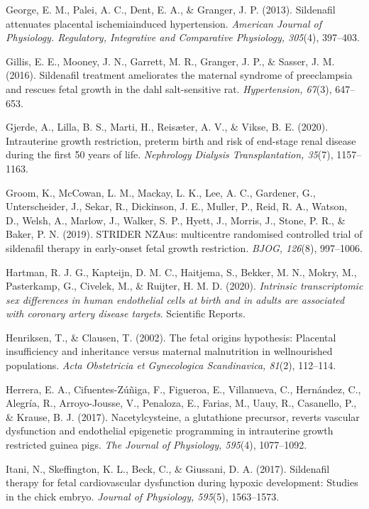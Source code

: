 \documentclass[authordate, empirical,issue]{jote-new-article}
\begin{document}
George, E. M., Palei, A. C., Dent, E. A., \& Granger, J. P. (2013). Sildenafil attenuates placental ischemiainduced hypertension. \emph{American Journal of Physiology. Regulatory, Integrative and Comparative Physiology, 305}(4), 397–403.

Gillis, E. E., Mooney, J. N., Garrett, M. R., Granger, J. P., \& Sasser, J. M. (2016). Sildenafil treatment ameliorates the maternal syndrome of preeclampsia and rescues fetal growth in the dahl salt-sensitive rat. \emph{Hypertension, 67}(3), 647–653.

Gjerde, A., Lilla, B. S., Marti, H., Reisæter, A. V., \& Vikse, B. E. (2020). Intrauterine growth restriction, preterm birth and risk of end-stage renal disease during the first 50 years of life. \emph{Nephrology Dialysis Transplantation, 35}(7), 1157–1163.

Groom, K., McCowan, L. M., Mackay, L. K., Lee, A. C., Gardener, G., Unterscheider, J., Sekar, R., Dickinson, J. E., Muller, P., Reid, R. A., Watson, D., Welsh, A., Marlow, J., Walker, S. P., Hyett, J., Morris, J., Stone, P. R., \& Baker, P. N. (2019). STRIDER NZAus: multicentre randomised controlled trial of sildenafil therapy in early-onset fetal growth restriction. \emph{BJOG, 126}(8), 997–1006.

Hartman, R. J. G., Kapteijn, D. M. C., Haitjema, S., Bekker, M. N., Mokry, M., Pasterkamp, G., Civelek, M., \& Ruijter, H. M. D. (2020). \emph{Intrinsic transcriptomic sex differences in human endothelial cells at birth and in adults are associated with coronary artery disease targets}. Scientific Reports.

Henriksen, T., \& Clausen, T. (2002). The fetal origins hypothesis: Placental insufficiency and inheritance versus maternal malnutrition in wellnourished populations. \emph{Acta Obstetricia et Gynecologica Scandinavica, 81}(2), 112–114.

Herrera, E. A., Cifuentes-Zúñiga, F., Figueroa, E., Villanueva, C., Hernández, C., Alegría, R., Arroyo-Jousse, V., Penaloza, E., Farias, M., Uauy, R., Casanello, P., \& Krause, B. J. (2017). Nacetylcysteine, a glutathione precursor, reverts vascular dysfunction and endothelial epigenetic programming in intrauterine growth restricted guinea pigs. \emph{The Journal of Physiology, 595}(4), 1077–1092.

Itani, N., Skeffington, K. L., Beck, C., \& Giussani, D. A. (2017). Sildenafil therapy for fetal cardiovascular dysfunction during hypoxic development: Studies in the chick embryo. \emph{Journal of Physiology, 595}(5), 1563–1573.
\end{document}
